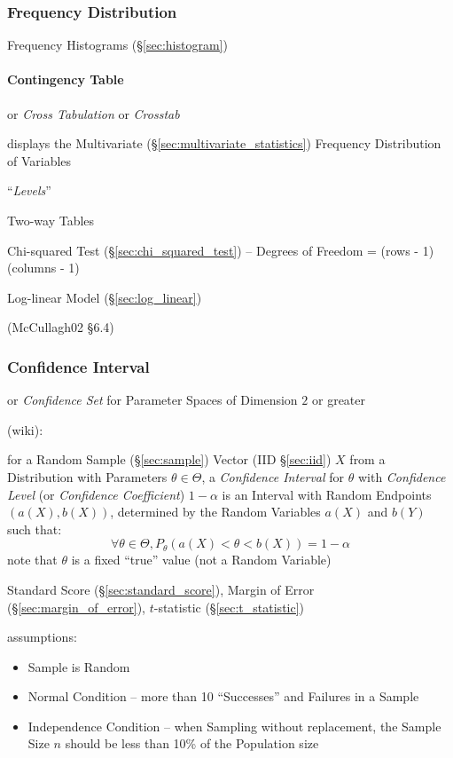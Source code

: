 \subsubsection{Frequency Distribution}\label{sec:frequency_distribution}

Frequency Histograms (\S\ref{sec:histogram})



\paragraph{Contingency Table}\label{sec:contingency_table}\hfill

or \emph{Cross Tabulation} or \emph{Crosstab}

displays the Multivariate (\S\ref{sec:multivariate_statistics}) Frequency
Distribution of Variables

``\emph{Levels}''

Two-way Tables

Chi-squared Test (\S\ref{sec:chi_squared_test}) -- Degrees of Freedom =
(rows - 1)(columns - 1)

Log-linear Model (\S\ref{sec:log_linear})

(McCullagh02 \S 6.4)



\subsubsection{Confidence Interval}\label{sec:confidence_interval}

or \emph{Confidence Set} for Parameter Spaces of Dimension $2$ or greater

(wiki):

for a Random Sample (\S\ref{sec:sample}) Vector (IID \S\ref{sec:iid}) $X$ from a
Distribution with Parameters $\theta \in \Theta$, a \emph{Confidence Interval}
for $\theta$ with \emph{Confidence Level} (or \emph{Confidence Coefficient}) $1
- \alpha$ is an Interval with Random Endpoints $(a(X), b(X))$, determined by the
Random Variables $a(X)$ and $b(Y)$ such that:
\[
  \forall \theta \in \Theta, P_\theta(a(X) < \theta < b(X)) = 1 - \alpha
\]
note that $\theta$ is a fixed ``true'' value (not a Random Variable)

\fist Standard Score (\S\ref{sec:standard_score}), Margin of Error
(\S\ref{sec:margin_of_error}), $t$-statistic (\S\ref{sec:t_statistic})

assumptions:
\begin{itemize}
  \item Sample is Random
  \item Normal Condition -- more than 10 ``Successes'' and Failures in a Sample
  \item Independence Condition -- when Sampling without replacement, the Sample
    Size $n$ should be less than 10\% of the Population size
\end{itemize}

